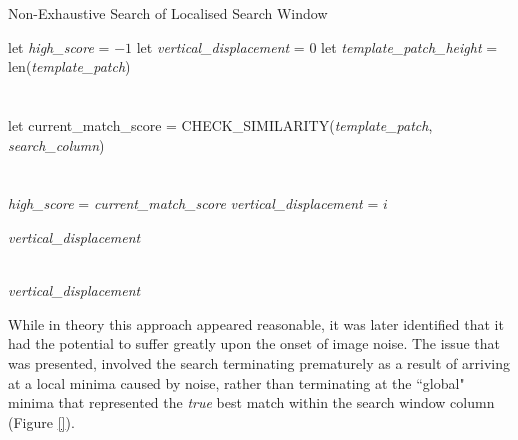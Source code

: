 \begin{algorithm}
\caption{Non-Exhaustive Search of Localised Search Window}
\label{nonexhautivesearch}
\begin{algorithmic}[1]


\State let \textit{high\_score} = $-1$
\State let \textit{vertical\_displacement} = $0$
\State let \textit{template\_patch\_height} = len(\textit{template\_patch})\\

 \\
 \\

\State let current\_match\_score = CHECK\_SIMILARITY(\textit{template\_patch}, \textit{search\_column}) \\

 \\

 \\
\State \textit{high\_score} = \textit{current\_match\_score}
\State \textit{vertical\_displacement} = $i$


\Else


\State \Return \textit{vertical\_displacement}

\EndIf

\EndFor

\\ \Return \textit{vertical\_displacement} \\
\EndProcedure

\end{algorithmic}
\end{algorithm}

While in theory this approach appeared reasonable, it was later identified that it had the potential to suffer greatly upon the onset of image noise. The issue that was presented, involved the search terminating prematurely as a result of arriving at a local minima caused by noise, rather than terminating at the ``global" minima that represented the \textit{true} best match within the search window column (Figure \ref{}). 

